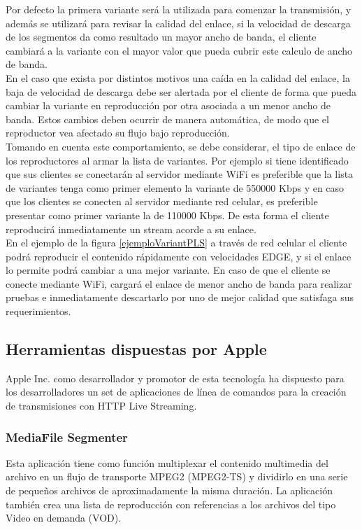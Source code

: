 Por defecto la primera variante será la utilizada para comenzar la transmisión, y además se utilizará para revisar la calidad del enlace, si la velocidad de descarga de los segmentos da como resultado un mayor ancho de banda, el cliente cambiará a la variante con el mayor valor que pueda cubrir este calculo de ancho de banda.\\

En el caso que exista por distintos motivos una caída en la calidad del enlace, la baja de velocidad de descarga debe ser alertada por el cliente de forma que pueda cambiar la variante en reproducción por otra asociada a un menor ancho de banda. Estos cambios deben ocurrir de manera automática, de modo que el reproductor vea afectado su flujo bajo reproducción.\\

Tomando en cuenta este comportamiento, se debe considerar, el tipo de enlace de los reproductores al armar la lista de variantes. Por ejemplo si tiene identificado que sus clientes se conectarán al servidor mediante WiFi es preferible que la lista de variantes tenga como primer elemento la variante de 550000 Kbps y en caso que los clientes se conecten al servidor mediante red celular, es preferible presentar como primer variante la de 110000 Kbps.
	De esta forma el cliente reproducirá inmediatamente un stream acorde a su enlace. \\
	
En el ejemplo de la figura \ref{ejemploVariantPLS} a través de red celular el cliente podrá reproducir el contenido rápidamente con velocidades EDGE, y si el enlace lo permite podrá cambiar a una mejor variante. En caso de que el cliente se conecte mediante WiFi, cargará el enlace de menor ancho de banda para realizar pruebas e inmediatamente descartarlo por uno de mejor calidad que satisfaga sus requerimientos.




	\subsection{Herramientas dispuestas por Apple}
	Apple Inc. como desarrollador y promotor de esta tecnología ha dispuesto para los desarrolladores un set de aplicaciones de línea de comandos para la creación de transmisiones con HTTP Live Streaming.
		\subsubsection{MediaFile Segmenter}
Esta aplicación tiene como función multiplexar el contenido multimedia del archivo en un flujo de transporte MPEG2 (MPEG2-TS) y dividirlo en una serie de pequeños archivos de aproximadamente la misma duración. La aplicación también crea una lista de reproducción con referencias a los archivos del tipo Video en demanda (VOD).

